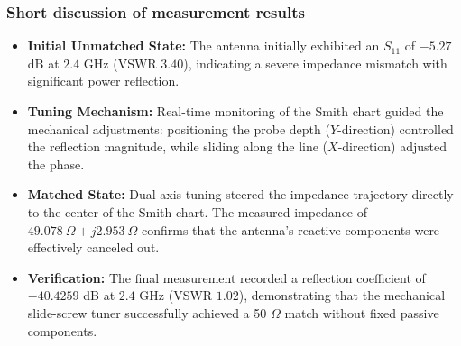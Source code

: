 \subsubsection{Short discussion of measurement results}

\begin{itemize}
    \item \textbf{Initial Unmatched State:} The antenna initially exhibited an $S_{11}$ of $-5.27$ dB at $2.4$ GHz (VSWR $3.40$), indicating a severe impedance mismatch with significant power reflection.
    
    \item \textbf{Tuning Mechanism:} Real-time monitoring of the Smith chart guided the mechanical adjustments: positioning the probe depth ($Y$-direction) controlled the reflection magnitude, while sliding along the line ($X$-direction) adjusted the phase.
    
    \item \textbf{Matched State:} Dual-axis tuning steered the impedance trajectory directly to the center of the Smith chart. The measured impedance of $49.078\ \Omega + j2.953\ \Omega$ confirms that the antenna's reactive components were effectively canceled out.
    
    \item \textbf{Verification:} The final measurement recorded a reflection coefficient of $-40.4259$ dB at $2.4$ GHz (VSWR $1.02$), demonstrating that the mechanical slide-screw tuner successfully achieved a 50 $\Omega$ match without fixed passive components.
\end{itemize}